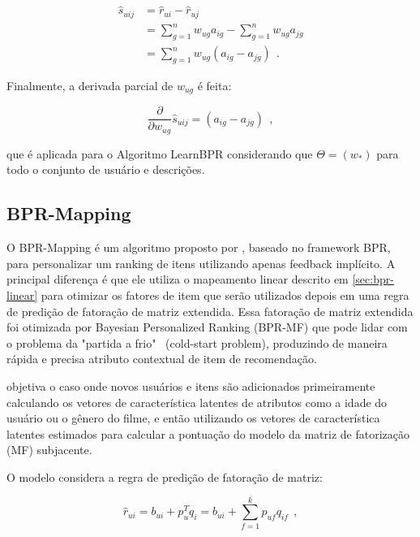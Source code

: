 \begin{equation}
\begin{array}{ll}
\hat{s}_{uij} &= \hat{r}_{ui} - \hat{r}_{uj} \\
&= \displaystyle\sum_{g=1}^{n} w_{ug} a_{ig} - \displaystyle\sum_{g=1}^{n} w_{ug} a_{jg} \\
&= \displaystyle\sum_{g=1}^{n} w_{ug} (a_{ig} - a_{jg})~~.
\end{array}
\end{equation}

Finalmente, a derivada parcial de $w_{ug}$ é feita:

\begin{equation}
\frac{\partial}{\partial w_{ug}}\hat{s}_{uij} = (a_{ig} - a_{jg})~~,
\end{equation}

\noindent que é aplicada para o Algoritmo LearnBPR considerando que $\Theta = (w_{*})$ para todo o conjunto de usuário e descrições.




\subsection{BPR-Mapping}
\label{sec:brp-mapping}
O BPR-Mapping é um algoritmo proposto por \citep{gantner2010}, baseado no framework \ac{BPR}, para personalizar um ranking de itens utilizando apenas feedback implícito. A principal diferença é que ele utiliza o mapeamento linear descrito em \ref{sec:bpr-linear} para otimizar os fatores de item que serão utilizados depois em uma regra de predição de fatoração de matriz extendida. Essa fatoração de matriz extendida foi otimizada por Bayesian Personalized Ranking (BPR-MF) \cite{Rendle:2009:BBP:1795114.1795167} que pode lidar com o problema da "partida a frio"~ (cold-start problem), produzindo de maneira rápida e precisa atributo contextual de item de recomendação.


\cite{gantner2010} objetiva o caso onde novos usuários e itens são adicionados primeiramente calculando os vetores de característica latentes de atributos como a idade do usuário ou o gênero do filme, e então utilizando os vetores de característica latentes estimados para calcular a pontuação do modelo da matriz de fatorização (MF) subjacente.

O modelo considera a regra de predição de fatoração de matriz:

\begin{equation}
\hat{r}_{ui} = b_{ui} + p^T_u q_i = b_{ui} + \displaystyle\sum_{f=1}^{k}p_{uf} q_{if}~~,
\end{equation}

